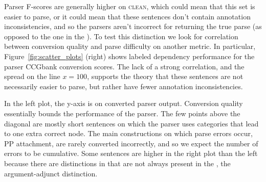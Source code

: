 Parser F-scores are generally higher on \textsc{clean}, which could mean that this
set is easier to parse, or it could mean that these sentences don't contain
annotation inconsistencies, and so the parsers aren't incorrect for returning
the true parse (as opposed to the one in the \ptb).  To test this distinction
we look for correlation between conversion quality and parse difficulty on
another metric.  In particular, Figure~\ref{fig:scatter_plots} (right) shows
\ccg labeled dependency performance for the \candc parser \myvs CCGbank
conversion \parseval scores. The lack of a strong correlation, and the spread
on the line $x=100$, supports the theory that these sentences are not
necessarily easier to parse, but rather have fewer annotation inconsistencies.

In the left plot, the y-axis is \parseval on converted \candc parser output.
Conversion quality essentially bounds the performance of the parser.  The few
points above the diagonal are mostly short sentences on which the \candc parser
uses categories that lead to one extra correct node.
The main constructions on which parse errors occur, \myeg PP attachment, are
rarely converted incorrectly, and so we expect the number of errors to be
cumulative.  Some sentences are higher in the right plot than the left because
there are distinctions in \ccg that are not always present in the \ptb, \myeg the
argument-adjunct distinction.

